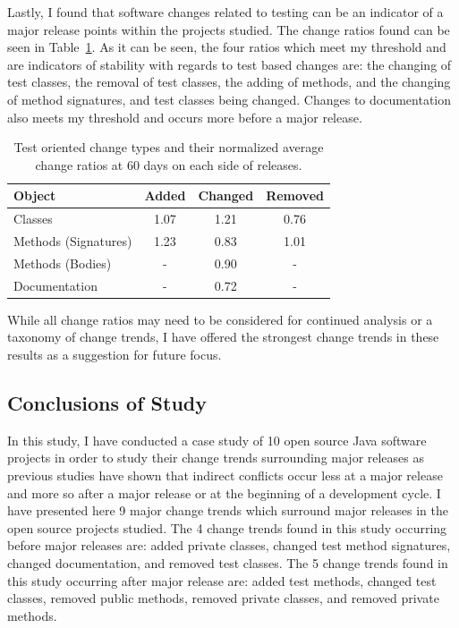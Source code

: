 Lastly, I found that software changes related to testing can be an indicator of a major release points within the projects studied. The change
ratios found can be seen in Table~\ref{tab:test}. As it can be seen, the four ratios which meet my threshold and are indicators of stability with regards to test based
changes are: the changing of test classes, the removal of test classes, the adding of methods, and the changing of method signatures, and test classes being changed.
Changes to documentation also meets my threshold and occurs more before a major release.

\begin{table}[ht]
\begin{center}
\begin{tabular}{| l | c | c | c |}
\hline
Object & Added & Changed & Removed\\
\hline
Classes & 1.07 & 1.21 & 0.76 \\
Methods (Signatures) & 1.23 & 0.83 & 1.01 \\
Methods (Bodies) & - & 0.90 & - \\
Documentation & - & 0.72 & - \\
\hline
\end{tabular}
\end{center}
\caption{Test oriented change types and their normalized average change ratios at 60 days on each side of releases. \label{tab:test}}
\end{table}

While all change ratios may need to be considered for continued analysis or a taxonomy of change trends, I have offered the strongest
change trends in these results as a suggestion for future focus.

\subsection{Conclusions of Study}

In this study, I have conducted a case study of 10 open source Java software projects in order to study their change trends surrounding
major releases as previous studies have shown that indirect conflicts occur less at a major release and more so after a major release
or at the beginning of a development cycle. I have presented here 9 major change trends which surround major releases in the open source
projects studied. The 4 change trends found in this study occurring before major releases are: added private classes, 
changed test method signatures, changed documentation, and removed test classes.
The 5 change trends found in this study occurring after major release are: added test methods, changed test classes, removed public methods, removed
private classes, and removed private methods.

